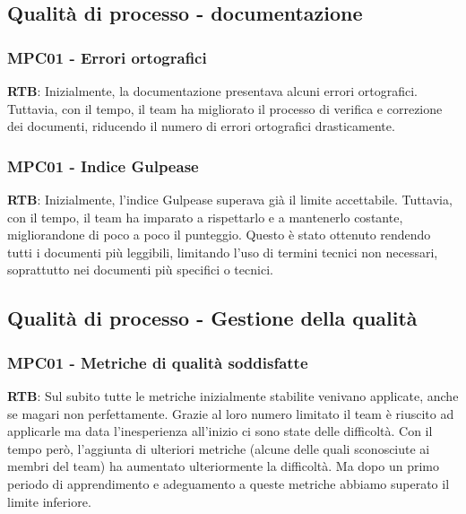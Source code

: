\documentclass[10pt]{article}
\begin{document}
\begin{justify}
\subsection{Qualità di processo - documentazione}
\subsubsection{MPC01 - Errori ortografici}
\textbf{RTB}: Inizialmente, la documentazione presentava alcuni errori ortografici. Tuttavia, con il tempo, il team ha migliorato il processo di verifica e correzione 
dei documenti, riducendo il numero di errori ortografici drasticamente.
\subsubsection{MPC01 - Indice Gulpease}
\textbf{RTB}: Inizialmente, l'indice Gulpease superava già il limite accettabile. Tuttavia, con il tempo, il team ha imparato a rispettarlo e a mantenerlo costante, 
migliorandone di poco a poco il punteggio. Questo è stato ottenuto rendendo tutti i documenti più leggibili, limitando l'uso di termini tecnici non necessari, 
soprattutto nei documenti più specifici o tecnici.
\subsection{Qualità di processo - Gestione della qualità}
\subsubsection{MPC01 - Metriche di qualità soddisfatte}
\textbf{RTB}: Sul subito tutte le metriche inizialmente stabilite venivano applicate, anche se magari non perfettamente. Grazie al loro numero limitato il team è 
riuscito ad applicarle ma data l'inesperienza all'inizio ci sono state delle difficoltà. Con il tempo però, l'aggiunta di ulteriori metriche (alcune delle quali 
sconosciute ai membri del team) ha aumentato ulteriormente la difficoltà. Ma dopo un primo periodo di apprendimento e adeguamento a queste metriche abbiamo superato 
il limite inferiore.



\end{justify}
\end{document}
